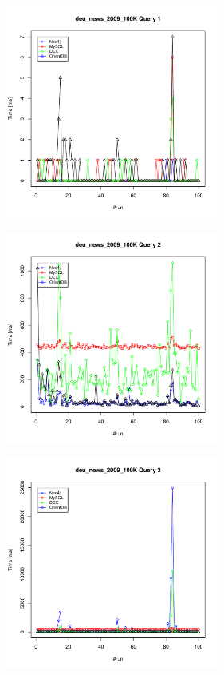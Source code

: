 \documentclass[11pt, a4paper, oneside]{article} %
\begin{document}
\begin{appendix}
\begin{landscape}
\begin{figure}[ht]
		\begin{minipage}[hbt]{6.5cm}
			\centering
			\includegraphics[width=7cm]{../results/cold caches/images/100K_query1_perf}
			\label{fig:100K_query1_perf}
		\end{minipage}
		\hfill
		\begin{minipage}[hbt]{6.5cm}
			\centering
			\includegraphics[width=7cm]{../results/cold caches/images/100K_query2_perf}
			\label{fig:100K_query2_perf}
		\end{minipage}
		\hfill
		\begin{minipage}[hbt]{6.5cm}
			\centering
			\includegraphics[width=7cm]{../results/cold caches/images/100K_query3_perf}
			\label{fig:100K_query3_perf}
		\end{minipage}
	\end{figure}
\end{landscape} 


\end{appendix}
\end{document}
